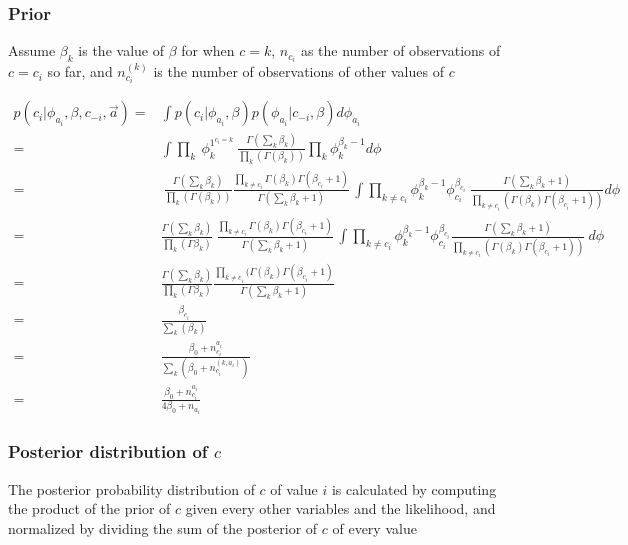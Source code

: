 \documentclass[../main.tex]{subfiles}
\begin{document}
\subsubsection{Prior}
Assume $\beta_{k}$ is the value of $\beta$ for when $c = k$, $n_{c_{i}}$ as the number of observations of $c=c_{i}$ so far, and  $n_{c_{i}}^{(k)}$ is the number of observations of other values of $c$ 

\begin{equation}
\begin{split}
 p(c_{i}|\phi_{a_{i}} ,\beta, c_{-i},  \vec{a})  =& \int p(c_{i}|\phi_{a_{i}}, \beta) p(\phi_{a_{i}}| c_{-i}, \beta)d\phi_{a_{i}} \\
= & \int \prod_{k}\ \phi_{k}^{1^{c_{i}=k}}\ \frac{\Gamma(\sum_{k}\beta_{k})}{\prod_{k}(\Gamma(\beta_{k}))}\prod_{k} \phi_{k}^{\beta_{k}-1}d\phi\\
= & \ \frac{\Gamma(\sum_{k}\beta_{k})}{\prod_{k}(\Gamma(\beta_{k}))} %
\frac{\prod_{k\neq c_{i}}\Gamma(\beta_{k})\Gamma (\beta_{c_{i}}+1)}{\Gamma(\sum_{k}\beta_{k} +1)} \, %
\int \prod_{k\neq c_{i}} \phi_{k}^{\beta_{k}-1} \phi_{c_{i}}^{\beta_{c_{i}}}\ %
\frac{\Gamma(\sum_{k}\beta_{k}+1)}{\prod_{k\neq c_{i}} (\Gamma(\beta_{k}) \Gamma(\beta_{c_{i}}+1))} d\phi\\%
= &  \frac{\Gamma(\sum_{k}\beta_{k})}{\prod_{k}(\Gamma\beta_{k})}\ %
\frac{\prod_{k\neq c_{i}}\Gamma(\beta_{k})\Gamma (\beta_{c_{i}}+1)}{\Gamma(\sum_{k}\beta_{k} +1)} \, %
\int \prod_{k\neq c_{i}} \phi_{k}^{\beta_{k}-1} \phi_{c_{i}}^{\beta_{c_{i}}}%
\frac{\Gamma(\sum_{k}\beta_{k} +1)}{\prod_{k\neq c_{i}} (\Gamma(\beta_{k}) \Gamma(\beta_{c_{i}}+1))} \  %
d\phi\\
=&\frac{\Gamma(\sum_{k}\beta_{k})}{\prod_{k}(\Gamma\beta_{k})}%
\frac{\prod_{k\neq c_{i}} (\Gamma(\beta_{k}) \Gamma(\beta_{c_{i}}+1)}{\Gamma(\sum_{k}\beta_{k}+1)} \\%
= &\frac{\beta_{c_{i}}}{\sum_{k}(\beta_{k})}\\
= & \frac{\beta_{0}+n_{c_{i}}^{a_{i}}}{\sum_{k}(\beta_{0}+n^{(k,a_{i})}_{c_{i}})}\\
= & \frac{\beta_{0}+n_{c_{i}}^{a_{i}}}{4\beta_{0}+n_{a_{i}}}
\end{split}
\end{equation}



\subsubsection{Posterior distribution of $c$}
The posterior probability distribution of $c$ of value $i$ is calculated by computing the product of the prior of $c$ given every other variables and the likelihood, and normalized by dividing the sum of the posterior of $c$ of every value
\end{document}
